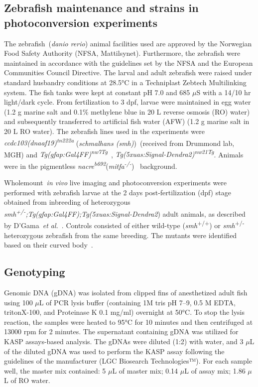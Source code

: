 \documentclass[fleqn]{wlscirep}
\begin{document}
\subsection*{Zebrafish maintenance and strains in photoconversion experiments}
The zebrafish~(\emph{danio rerio}) animal facilities used are approved by the Norwegian Food Safety Authority (NFSA, Mattilsynet). Furthermore, the zebrafish were maintained in accordance with the guidelines set by the NFSA and the European Communities Council Directive. The larval and adult zebrafish were raised under standard husbandry conditions at 28.5°C in a Techniplast Zebtech Multilinking system. The fish tanks were kept at constant pH 7.0 and 685 $\mu$S with a 14/10 hr light/dark cycle. From fertilization to 3 dpf, larvae were maintained in egg water (1.2 g marine salt and 0.1\% methylene blue in 20 L reverse osmosis (RO) water) and subsequently transferred to artificial fish water (AFW) (1.2 g marine salt in 20 L RO water). The zebrafish lines used in the experiments were \emph{ccdc103(dnaaf19)\textsuperscript{tn222a}} (\emph{schmalhans (smh)})~\cite{Jau-NianChen1997Left-rightZebrafish}(received from Drummond lab, MGH) and \emph{Tg(gfap:Gal4FF)\textsuperscript{nw7Tg}}~\cite{DiazVerdugo2019Glia-neuronSeizures}, \emph{Tg(5xuas:Signal-Dendra2)\textsuperscript{nw21Tg}}. Animals were in the pigmentless \emph{nacre\textsuperscript{b692}}(\emph{mitfa\textsuperscript{-/-}})~\cite{JamesA.Lister1999NacreFate} background.

Wholemount~\emph{in vivo} live imaging and photoconversion experiments were performed with zebrafish larvae at the 2 days post-fertilization (dpf) stage obtained from inbreeding of heterozygous \emph{smh\textsuperscript{+/-};Tg(gfap:Gal4FF);Tg(5xuas:Signal-Dendra2}) adult animals, as described by D’Gama~\emph{et al.}~\cite{DGama2024Cilia-mediatedBrain}. Controls consisted of either wild-type (\emph{smh}\textsuperscript{+/+}) or \emph{smh}\textsuperscript{+/-} heterozygous zebrafish from the same breeding. The mutants were identified based on their curved body~\cite{Jau-NianChen1997Left-rightZebrafish}.

\subsection*{Genotyping}
Genomic DNA (gDNA) was isolated from clipped fins of anesthetized adult fish using 100 $\mu$L of PCR lysis buffer (containing 1M tris pH 7--9, 0.5 M EDTA, tritonX-100, and Proteinase K 0.1 mg/ml) overnight at 50°C. To stop the lysis reaction, the samples were heated to 95°C for 10 minutes and then centrifuged at 13000 rpm for 2 minutes. The supernatant containing gDNA was utilized for KASP assays-based analysis. The gDNAs were diluted (1:2) with water, and 3 $\mu$L of the diluted gDNA was used to perform the KASP assay following the guidelines of the manufacturer (LGC Biosearch Technologies™). For each sample well, the master mix contained: 5 $\mu$L of master mix; 0.14 $\mu$L of assay mix; 1.86 $\mu$L of RO water.
\end{document}
